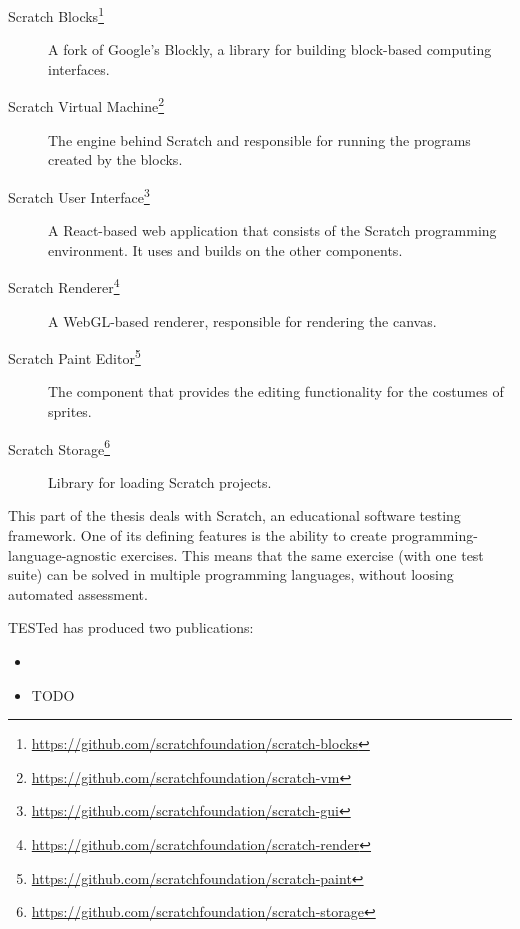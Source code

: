 \documentclass[./main]{subfiles}
\begin{document}
\begin{description}
    \item[Scratch Blocks\footnote{\url{https://github.com/scratchfoundation/scratch-blocks}}] A fork of Google's Blockly, a library for building block-based computing interfaces.
    \item[Scratch Virtual Machine\footnote{\url{https://github.com/scratchfoundation/scratch-vm}}] The engine behind Scratch and responsible for running the programs created by the blocks.
    \item[Scratch User Interface\footnote{\url{https://github.com/scratchfoundation/scratch-gui}}] A React-based web application that consists of the Scratch programming environment. It uses and builds on the other components.
    \item[Scratch Renderer\footnote{\url{https://github.com/scratchfoundation/scratch-render}}] A WebGL-based renderer, responsible for rendering the canvas.
    \item[Scratch Paint Editor\footnote{\url{https://github.com/scratchfoundation/scratch-paint}}] The component that provides the editing functionality for the costumes of sprites.
    \item[Scratch Storage\footnote{\url{https://github.com/scratchfoundation/scratch-storage}}] Library for loading Scratch projects.
\end{description}

This part of the thesis deals with Scratch, an educational software testing framework.
One of its defining features is the ability to create programming-language-agnostic exercises.
This means that the same exercise (with one test suite) can be solved in multiple programming languages, without loosing automated assessment.

TESTed has produced two publications:

\begin{itemize}
    \item {}
    \item TODO
\end{itemize}
\end{document}
